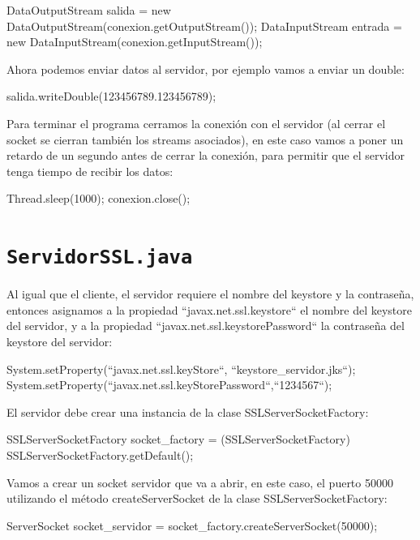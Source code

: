 \begin{SourceCode}
DataOutputStream salida = new DataOutputStream(conexion.getOutputStream());
DataInputStream entrada = new DataInputStream(conexion.getInputStream());
\end{SourceCode}

Ahora podemos enviar datos al servidor, por ejemplo vamos a enviar un double:

\begin{SourceCode}
salida.writeDouble(123456789.123456789);
\end{SourceCode}

Para terminar el programa cerramos la conexión con el servidor (al cerrar el socket se cierran también los streams asociados), en este caso vamos a poner un retardo de un segundo antes de cerrar la conexión, para permitir que el servidor tenga tiempo de recibir los datos:

\begin{SourceCode}
Thread.sleep(1000);
conexion.close();
\end{SourceCode}

\section{\texttt{ServidorSSL.java}}

Al igual que el cliente, el servidor requiere el nombre del keystore y la contraseña, entonces asignamos a la propiedad ``javax.net.ssl.keystore`` el nombre del keystore del servidor, y a la propiedad ``javax.net.ssl.keystorePassword`` la contraseña del keystore del servidor:

\begin{SourceCode}
System.setProperty(``javax.net.ssl.keyStore``, ``keystore_servidor.jks``);
System.setProperty(``javax.net.ssl.keyStorePassword``,``1234567``);
\end{SourceCode}

El servidor debe crear una instancia de la clase SSLServerSocketFactory:

\begin{SourceCode}
SSLServerSocketFactory socket_factory = (SSLServerSocketFactory) SSLServerSocketFactory.getDefault();
\end{SourceCode}

Vamos a crear un socket servidor que va a abrir, en este caso, el puerto 50000 utilizando el método createServerSocket de la clase SSLServerSocketFactory:

\begin{SourceCode}
ServerSocket socket_servidor = socket_factory.createServerSocket(50000);
\end{SourceCode}

